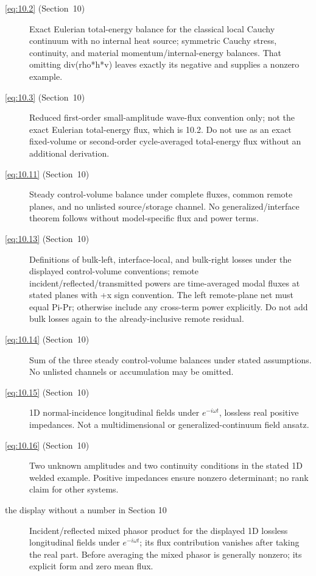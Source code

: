 \begin{description}
  \item[\eqref{eq:10.2} (Section~10)] Exact Eulerian total-energy balance for the classical local Cauchy continuum with no internal heat source; symmetric Cauchy stress, continuity, and material momentum/internal-energy balances. That omitting div(rho*h*v) leaves exactly its negative and supplies a nonzero example.

  \item[\eqref{eq:10.3} (Section~10)] Reduced first-order small-amplitude wave-flux convention only; not the exact Eulerian total-energy flux, which is 10.2. Do not use as an exact fixed-volume or second-order cycle-averaged total-energy flux without an additional derivation.

  \item[\eqref{eq:10.11} (Section~10)] Steady control-volume balance under complete fluxes, common remote planes, and no unlisted source/storage channel. No generalized/interface theorem follows without model-specific flux and power terms.

  \item[\eqref{eq:10.13} (Section~10)] Definitions of bulk-left, interface-local, and bulk-right losses under the displayed control-volume conventions; remote incident/reflected/transmitted powers are time-averaged modal fluxes at stated planes with +x sign convention. The left remote-plane net must equal Pi-Pr; otherwise include any cross-term power explicitly. Do not add bulk losses again to the already-inclusive remote residual.

  \item[\eqref{eq:10.14} (Section~10)] Sum of the three steady control-volume balances under stated assumptions. No unlisted channels or accumulation may be omitted.

  \item[\eqref{eq:10.15} (Section~10)] 1D normal-incidence longitudinal fields under $e^{-i \omega t}$, lossless real positive impedances. Not a multidimensional or generalized-continuum field ansatz.

  \item[\eqref{eq:10.16} (Section~10)] Two unknown amplitudes and two continuity conditions in the stated 1D welded example. Positive impedances ensure nonzero determinant; no rank claim for other systems.

  \item[the display without a number in Section 10] Incident/reflected mixed phasor product for the displayed 1D lossless longitudinal fields under $e^{-i \omega t}$; its flux contribution vanishes after taking the real part. Before averaging the mixed phasor is generally nonzero; its explicit form and zero mean flux.


\end{description}

